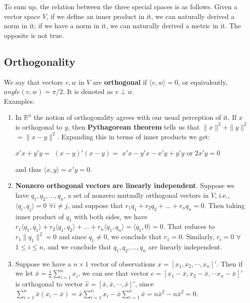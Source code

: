 \documentclass[12pt,oneside]{article}
\begin{document}
To sum up, the relation between the three special spaces is as follows.
Given a vector space $V$, if we define an inner product in it, we can naturally derived a norm in it; 
if we have a norm in it, we can naturally derived a metric in it.
The opposite is not true.

\subsection{Orthogonality}

We say that vectors $v, w$ in $V$ are \textbf{orthogonal} if $ \langle v, w \rangle =
0$, or equivalently, $angle(v,w)=\pi/2$. It is denoted as $v\perp w.$\\

\noindent Examples:
\begin{enumerate}
\item In ${\mathbb{R}}^n$ the notion of orthogonality agrees with our
  usual perception of it. If $x$ is orthogonal to $y$, then
  \textbf{Pythagorean theorem} tells us that $\|x\|^2 + \|y\|^2$ $= \|x -
  y\|^2$. Expanding this in terms of inner products we get:
\begin{center}
$x'x + y'y =$ $(x-y)'(x-y) =$ $x'x - y'x - x'y + y'y$ or $2 x'y = 0$
\end{center}
and thus $ \langle x, y \rangle = x'y = 0$.
\item \textbf{Nonzero orthogonal vectors are linearly independent}. Suppose we have $q_1, q_2, \ldots, q_n$, a set of nonzero mutually orthogonal vectors in $V$, i.e., $ \langle q_i, q_j \rangle = 0$ $\forall i \neq j$, and suppose that $r_1 q_1 + r_2 q_2 + \ldots + r_n q_n = 0$. Then taking inner product of $q_1$ with both sides, we have $r_1 \langle q_1, q_1 \rangle + r_2 \langle q_1, q_2 \rangle + \ldots + r_n \langle q_1, q_n\rangle = \langle q_1, 0 \rangle = 0$.  That reduces to $r_1 \|q_1\|^2 = 0$ and since $q_1 \neq 0$, we conclude that $r_1 = 0$. Similarly, $r_i = 0$ $\forall$ $1 \leq i \leq n$, and we conclude that $q_1, q_2, \ldots, q_n$ are linearly independent.
\item Suppose we have a $n \times 1$ vector of observations $x =\left[ x_1, x_2, \cdots, x_n \right]'$. Then if we let $\bar{x} = \frac{1}{n} \displaystyle\sum_{i=1}^n {x_i}$, we can see that vector $e = \left[ x_1 - \bar{x}, x_2 - \bar{x}, \cdots x_n - \bar{x} \right]'$ is orthogonal to vector $\hat{x} = \left[ \bar{x}, \bar{x}, \cdots, \bar{x} \right]'$, since $\displaystyle\sum_{i=1}^n {\bar{x} (x_i - \bar{x})} = \bar{x} \displaystyle\sum_{i=1}^n{x_i} - \bar{x}  \displaystyle\sum_{i=1}^n {\bar{x}} = n {\bar{x}}^2 - n {\bar{x}}^2 = 0$.
\end{enumerate}
\end{document}
